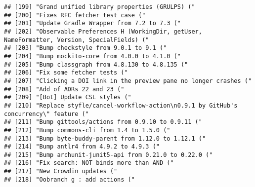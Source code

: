 \documentclass[
]{article}
\begin{document}
\begin{verbatim}
## [199] "Grand unified library properties (GRULPS) ("                                                                                
## [200] "Fixes RFC fetcher test case ("                                                                                              
## [201] "Update Gradle Wrapper from 7.2 to 7.3 ("                                                                                    
## [202] "Observable Preferences H (WorkingDir, getUser, NameFormatter, Version, SpecialFields) ("                                    
## [203] "Bump checkstyle from 9.0.1 to 9.1 ("                                                                                        
## [204] "Bump mockito-core from 4.0.0 to 4.1.0 ("                                                                                    
## [205] "Bump classgraph from 4.8.130 to 4.8.135 ("                                                                                  
## [206] "Fix some fetcher tests ("                                                                                                   
## [207] "Clicking a DOI link in the preview pane no longer crashes ("                                                                
## [208] "Add of ADRs 22 and 23 ("                                                                                                    
## [209] "[Bot] Update CSL styles ("                                                                                                  
## [210] "Replace styfle/cancel-workflow-action\n0.9.1 by GitHub's concurrency\" feature ("                                           
## [211] "Bump gittools/actions from 0.9.10 to 0.9.11 ("                                                                              
## [212] "Bump commons-cli from 1.4 to 1.5.0 ("                                                                                       
## [213] "Bump byte-buddy-parent from 1.12.0 to 1.12.1 ("                                                                             
## [214] "Bump antlr4 from 4.9.2 to 4.9.3 ("                                                                                          
## [215] "Bump archunit-junit5-api from 0.21.0 to 0.22.0 ("                                                                           
## [216] "Fix search: NOT binds more than AND ("                                                                                      
## [217] "New Crowdin updates ("                                                                                                      
## [218] "Oobranch g : add actions ("                                                                                                 

\end{verbatim}
\end{document}
